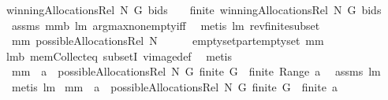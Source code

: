 \begin{isabellebody}
{\isachardoublequoteopen}winningAllocationsRel\ N\ G\ bids\ {\isasymnoteq}\ {\isacharbraceleft}{\isacharbraceright}\ {\isacharampersand}\ finite\ {\isacharparenleft}winningAllocationsRel\ N\ G\ bids{\isacharparenright}{\isachardoublequoteclose}\ \isanewline
%
\isadelimproof
%
\endisadelimproof
%
\isatagproof
{}\isamarkupfalse%
\ assms\ mm{}{}b\ lm{}{}\ argmax{\isacharunderscore}non{\isacharunderscore}empty{\isacharunderscore}iff\ \isamarkupfalse%
\ {\isacharparenleft}metis\ lm{}{}\ rev{\isacharunderscore}finite{\isacharunderscore}subset{\isacharparenright}%
\endisatagproof
{\isafoldproof}%
%
\isadelimproof
\isanewline
%
\endisadelimproof
\isanewline
{}\isamarkupfalse%
\ mm{}{}{\isacharcolon}\ {\isachardoublequoteopen}possibleAllocationsRel\ N\ {\isacharbraceleft}{\isacharbraceright}\ {\isasymsubseteq}\ {\isacharbraceleft}{\isacharbraceleft}{\isacharbraceright}{\isacharbraceright}{\isachardoublequoteclose}%
\isadelimproof
\ %
\endisadelimproof
%
\isatagproof
{}\isamarkupfalse%
\ emptyset{\isacharunderscore}part{\isacharunderscore}emptyset{}\ mm{}{}\ \isanewline
lm{}{}b\ mem{\isacharunderscore}Collect{\isacharunderscore}eq\ subsetI\ vimage{\isacharunderscore}def\ \isamarkupfalse%
\ metis%
\endisatagproof
{\isafoldproof}%
%
\isadelimproof
%
\endisadelimproof
\isanewline
\isanewline
{}\isamarkupfalse%
\ mm{}{}{\isacharcolon}\ \ {\isachardoublequoteopen}a\ {\isasymin}\ possibleAllocationsRel\ N\ G{\isachardoublequoteclose}\ {\isachardoublequoteopen}finite\ G{\isachardoublequoteclose}\ \ {\isachardoublequoteopen}finite\ {\isacharparenleft}Range\ a{\isacharparenright}{\isachardoublequoteclose}\ \isanewline
%
\isadelimproof
%
\endisadelimproof
%
\isatagproof
{}\isamarkupfalse%
\ assms\ lm{}{}\ \isamarkupfalse%
\ {\isacharparenleft}metis\ lm{}{}{\isacharparenright}%
\endisatagproof
{\isafoldproof}%
%
\isadelimproof
\isanewline
%
\endisadelimproof
\isanewline
{}\isamarkupfalse%
\ mm{}{}{\isacharcolon}\ \ {\isachardoublequoteopen}a\ {\isasymin}\ possibleAllocationsRel\ N\ G{\isachardoublequoteclose}\ {\isachardoublequoteopen}finite\ G{\isachardoublequoteclose}\ \ {\isachardoublequoteopen}finite\ a{\isachardoublequoteclose}\isanewline

\end{isabellebody}

